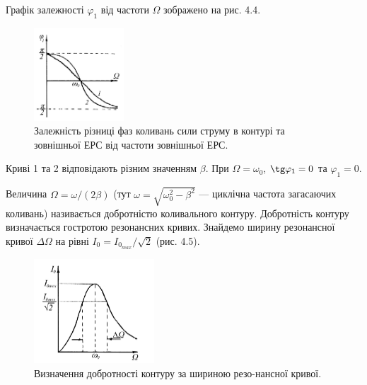 \documentclass[12pt,a4paper]{article}
\begin{document}
    \vspace{0.5em}

    Графік залежності $\varphi_1$ від частоти $\Omega$ зображено на
    рис. 4.4.

    \newpage

    \begin{figure}[h!]

        \renewcommand{\thefigure}{4.\arabic{figure}} %

        \centering
        \includegraphics[width=0.3\textwidth]{4.4.png}
        \caption{Залежність різниці фаз коливань сили струму в контурі та зовнішньої ЕРС від частоти зовнішньої ЕРС.}
        \label{fig4:schema}

    \end{figure}
    
    Криві 1 та 2 відповідають різним значенням $\beta$.
    При $\Omega = \omega_0$, $\tg \varphi_1 = 0$ та $\varphi_1 = 0$.

    Величина $\Omega = \omega / (2 \beta)$ (тут $\omega = \sqrt{\omega_0^2 - \beta^2}$ --- циклічна частота загасаючих коливань)
    називається добротністю коливального контуру.
    Добротність контуру визначається гостротою резонансних кривих.
    Знайдемо ширину резонансної кривої $\Delta \Omega$ на
    рівні $I_0 = I_{0_{max}} / \sqrt{2}$ (рис. 4.5).

    \begin{figure}[h!]

        \renewcommand{\thefigure}{4.\arabic{figure}} %

        \centering
        \includegraphics[width=0.4\textwidth]{4.5.png}
        \caption{Визначення добротності контуру за шириною резо-нансної кривої.}
        \label{fig5:schema}

    \end{figure}
\end{document}
